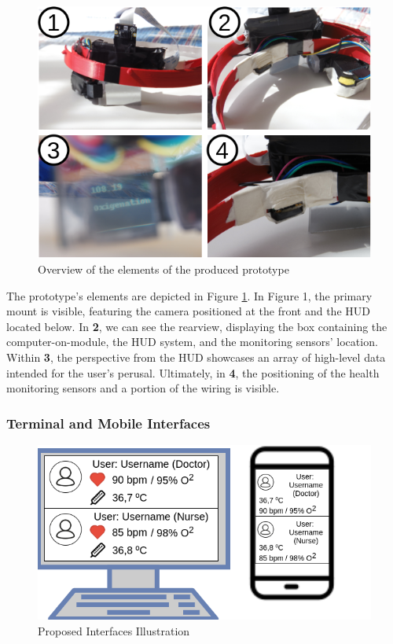 \begin{figure}[h!]
    \centering
    \includegraphics[width=.70\linewidth]{Figures/prototype-elements.png}
    \caption{Overview of the elements of the produced prototype}
    \label{fig:prt-elements}
\end{figure}

The prototype's elements are depicted in Figure \ref{fig:prt-elements}. In Figure 1, the primary mount is visible, featuring the camera positioned at the front and the HUD located below. In \textbf{2}, we can see the rearview, displaying the box containing the computer-on-module, the HUD system, and the monitoring sensors' location. Within \textbf{3}, the perspective from the HUD showcases an array of high-level data intended for the user's perusal. Ultimately, in \textbf{4}, the positioning of the health monitoring sensors and a portion of the wiring is visible.

\subsubsection{Terminal and Mobile Interfaces}

\begin{figure}[h!]
    \centering
    \includegraphics[width=.6\linewidth]{Figures/terminal-tools.png}
    \caption{Proposed Interfaces Illustration}
    \label{fig:interfaces}
\end{figure}

